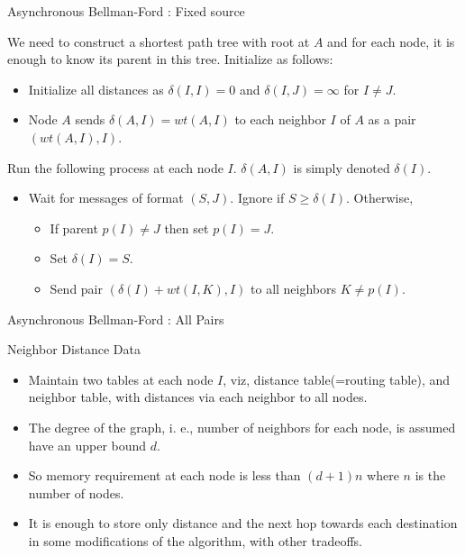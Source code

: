 
\begin{frame}{Asynchronous Bellman-Ford : Fixed source}

We need to construct a shortest path tree with root at $A$ and for each node, it is enough to know its parent in this tree.
Initialize as follows:
\begin{itemize}
\item Initialize all distances as $\delta (I,I) =0$ and $\delta (I,J) = \infty$ for $I\neq J$.
\item Node $A$ sends $\delta (A,I)=wt(A,I)$ to each neighbor $I$ of $A$ as a pair $(wt(A,I), I)$.
\end{itemize}
Run the following process at each node $I$. $\delta (A,I)$ is simply denoted $\delta (I)$.
\begin{itemize}
\item Wait for messages of format $(S, J)$. Ignore if $S \geq \delta (I)$. Otherwise,
\begin{itemize}
\item[] If parent $p(I) \neq J$ then set $p(I) = J$.
\item[] Set $\delta (I) = S$.
\item[] Send pair $(\delta (I) + wt(I,K), I)$ to all neighbors $K \neq p(I)$.
\end{itemize}
\end{itemize}
\end{frame}


\begin{frame}{Asynchronous Bellman-Ford : All Pairs}

\begin{block}{Neighbor Distance Data}
\begin{itemize}
\item[] Maintain two tables at each node $I$, viz, distance table(=routing table), and neighbor table,
with distances via each neighbor to all nodes.
\item[] The degree of the graph, i. e., number of neighbors for each node, is assumed have an upper bound $d$.
\item[] So memory requirement at each node is less than $(d+1)n$ where $n$ is the number of nodes.
\item[] It is enough to store only distance and the next hop towards each destination in some modifications of the algorithm, with other tradeoffs.
\end{itemize}
\end{block}
\end{frame}

